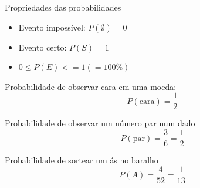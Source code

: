 \documentclass{beamer}
\begin{document}

\begin{frame}{Propriedades das probabilidades}
  \begin{itemize}
  \item Evento impossível: $P(\emptyset) = 0$
  \item Evento certo: $P(S) = 1$
  \item $0 \le P(E) <= 1 (=100\%)$
  \end{itemize}
\end{frame}



    




\begin{frame}%
  \begin{example}
Probabilidade de observar cara em uma moeda:
\begin{displaymath}
  P(\text{cara}) = \frac{1}{2}
\end{displaymath}
  \end{example}

  \begin{example}
Probabilidade de observar um número par num dado
    \begin{displaymath}
      P( \text{par} ) = \frac{3}{6} = \frac{1}{2}
    \end{displaymath}
  \end{example}

  \begin{example}
Probabilidade de sortear um ás no baralho
    \begin{displaymath}
      P( A ) = \frac{4}{52} = \frac{1}{13}
    \end{displaymath}
  \end{example}

\end{frame}
\end{document}
